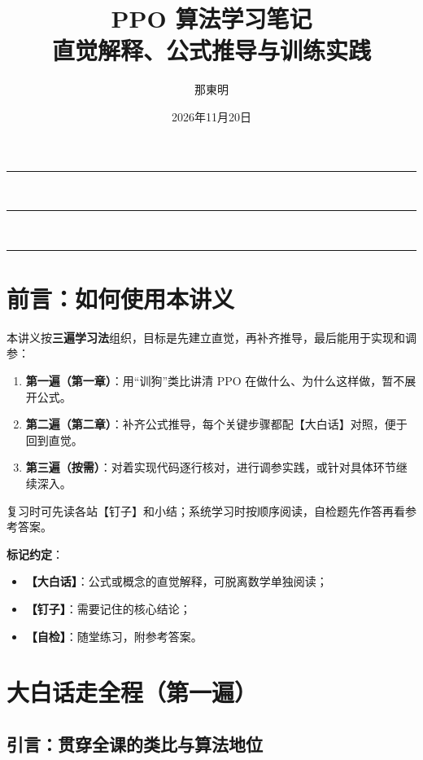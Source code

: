 \documentclass[UTF8,12pt,a4paper]{ctexrep}
\title{\textbf{PPO 算法学习笔记}\\[6pt]
\large 直觉解释、公式推导与训练实践}
\author{那東明}
\date{2026年11月20日}
\makeatletter
\renewcommand{\maketitle}{%
  \begin{titlepage}
    \centering
    \vspace*{1.5cm}
    {\color{main}\rule{\textwidth}{2.5pt}}\\[1.0cm]
    {\Huge\bfseries\color{main}\@title\par}
    \vspace{0.35cm}
    {\color{main}\rule{\textwidth}{0.8pt}}\\[1.4cm]
    {\Large\@author\par}
    \vspace{0.6cm}
    {\large\@date\par}
    \vfill
    {\color{main}\rule{\textwidth}{0.8pt}}
    \vspace{0.5cm}
  \end{titlepage}
}
\makeatother
\begin{document}
\maketitle
\tableofcontents

\chapter*{前言：如何使用本讲义}

本讲义按\textbf{三遍学习法}组织，目标是先建立直觉，再补齐推导，最后能用于实现和调参：

\begin{enumerate}[nosep]
  \item \textbf{第一遍（第一章）}：用``训狗''类比讲清 PPO 在做什么、为什么这样做，暂不展开公式。
  \item \textbf{第二遍（第二章）}：补齐公式推导，每个关键步骤都配【大白话】对照，便于回到直觉。
  \item \textbf{第三遍（按需）}：对着实现代码逐行核对，进行调参实践，或针对具体环节继续深入。
\end{enumerate}

复习时可先读各站【钉子】和小结；系统学习时按顺序阅读，自检题先作答再看参考答案。

\textbf{标记约定}：

\begin{itemize}[nosep]
  \item {\color{blue!70!black}\textbf{【大白话】}}：公式或概念的直觉解释，可脱离数学单独阅读；
  \item {\color{red!60!black}\textbf{【钉子】}}：需要记住的核心结论；
  \item {\color{green!50!black}\textbf{【自检】}}：随堂练习，附参考答案。
\end{itemize}

\chapter{大白话走全程（第一遍）}

\section{引言：贯穿全课的类比与算法地位}
\end{document}
